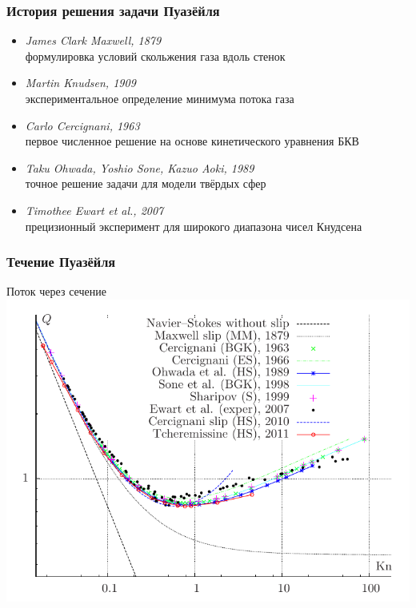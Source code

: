 \documentclass[ucs]{beamer}
\begin{document}
\begin{frame}
	\frametitle{История решения задачи Пуазёйля}
	\begin{itemize}
		\item \textit{James Clark Maxwell, 1879} \\ формулировка условий скольжения газа вдоль стенок \\
		\item \textit{Martin Knudsen, 1909} \\ экспериментальное определение минимума потока газа \\
		\item \textit{Carlo Cercignani, 1963} \\ первое численное решение на основе кинетического уравнения БКВ \\
		\item \textit{Taku Ohwada, Yoshio Sone, Kazuo Aoki, 1989} \\ точное решение задачи для модели твёрдых сфер \\
		\item \textit{Timothee Ewart et al., 2007} \\ прецизионный эксперимент для широкого диапазона чисел Кнудсена \\
	\end{itemize}
\end{frame}

\begin{frame}
	\frametitle{Течение Пуазёйля}
	\begin{center}
		Поток через сечение\\
		\includegraphics[width=.8\textwidth]{pics/poiseuille}
	\end{center}
\end{frame}
\end{document}
